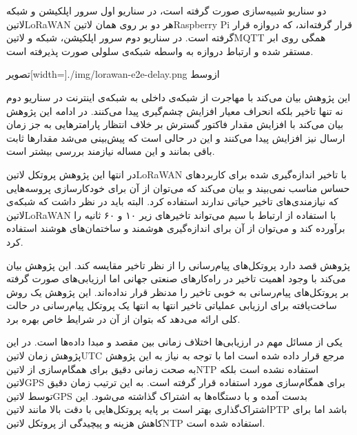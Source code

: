 دو سناریو شبیه‌سازی صورت گرفته است، در سناریو اول سرور اپلکیشن و شبکه ‌لاتین{LoRaWAN} هر دو بر روی همان ‌لاتین{Raspberry Pi}
قرار گرفته‌اند، که دروازه قرار گرفته است. در سناریو دوم سرور اپلکیشن، شبکه و ‌لاتین{MQTT} همگی روی ابر مستقر شده و ارتباط
دروازه به واسطه شبکه‌ی سلولی صورت پذیرفته است.

‌تصویر[width=\textwidth]{./img/lorawan-e2e-delay.png}
‌ازوسط

این پژوهش بیان می‌کند با مهاجرت از شبکه‌ی داخلی به شبکه‌ی اینترنت در سناریو دوم نه تنها تاخیر بلکه انحراف معیار افزایش چشم‌گیری
پیدا می‌کنند. در ادامه این پژوهش بیان می‌کند با افزایش مقدار فاکتور گسترش بر خلاف انتظار پارامترهایی به جز زمان ارسال نیز افزایش پیدا می‌کنند
و این در حالی است که پیش‌بینی می‌شد مقدارها ثابت باقی بمانند و این مساله نیازمند بررسی بیشتر است.

در انتها این پژوهش پروتکل ‌لاتین{LoRaWAN} با تاخیر اندازه‌گیری شده برای کاربردهای حساس مناسب نمی‌بیند و بیان می‌کند که می‌توان از آن
برای خودکارسازی پروسه‌هایی که نیازمندی‌های تاخیر حیاتی ندارند استفاده کرد. البته باید در نظر داشت که شبکه‌ی ‌لاتین{LoRaWAN} با استفاده از
ارتباط با سیم می‌تواند تاخیرهای زیر ۱۰ و ۶۰ ثانیه را برآورده کند و می‌توان از آن برای اندازه‌گیری هوشمند و ساختمان‌های هوشند استفاده کرد.



پژوهش  قصد دارد پروتکل‌های پیام‌رسانی را از نظر تاخیر مقایسه کند.
این پژوهش بیان می‌کند با وجود اهمیت تاخیر در راه‌کارهای صنعتی جهانی اما ارزیابی‌های صورت گرفته بر
پروتکل‌های پیام‌رسانی به خوبی تاخیر را مدنظر قرار نداده‌اند.
این پژوهش یک روش ساخت‌یافته برای ارزیابی عملیاتی تاخیر انتها به انتها یک پروتکل پیام‌رسانی در حالت کلی ارائه می‌دهد که بتوان از آن
در شرایط خاص بهره برد.

یکی از مسائل مهم در ارزیابی‌ها اختلاف زمانی بین مقصد و مبدا داده‌ها است. در این پژوهش زمان ‌لاتین{UTC} مرجع قرار داده شده است اما با توجه به نیاز به این پژوهش به صحت زمانی دقیق
برای همگام‌سازی از ‌لاتین{NTP} استفاده نشده است بلکه ‌لاتین{GPS} برای همگام‌سازی مورد استفاده قرار گرفته است.
به این ترتیب زمان دقیق توسط ‌لاتین{GPS} بدست آمده و با دستگاه‌ها به اشتراک گذاشته می‌شود. این اشتراک‌گذاری بهتر است بر پایه پروتکل‌هایی با دقت بالا مانند ‌لاتین{PTP} باشد اما
برای کاهش هزینه و پیچیدگی از پروتکل ‌لاتین{NTP} استفاده شده است.

